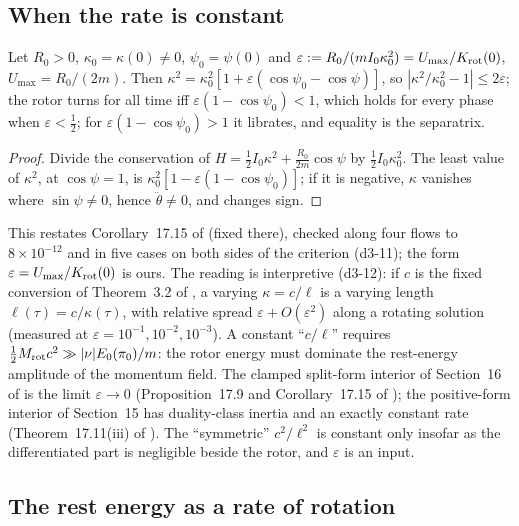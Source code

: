 \subsection{When the rate is constant}
\label{d3:sec:multiscale}

\begin{proposition}
\label{d3:prop:multiscale}
Let $R_0>0$, $\kappa_0=\kappa(0)\neq0$, $\psi_0=\psi(0)$ and $\varepsilon:=R_0/(mI_0\kappa_0^2)=U_{\max}/K_{\rm rot}(0)$, $U_{\max}=R_0/(2m)$. Then
$\kappa^2=\kappa_0^2[1+\varepsilon(\cos\psi_0-\cos\psi)]$, so $|\kappa^2/\kappa_0^2-1|\le2\varepsilon$; the rotor turns for all time iff
$\varepsilon(1-\cos\psi_0)<1$, which holds for every phase when $\varepsilon<\tfrac12$; for $\varepsilon(1-\cos\psi_0)>1$ it librates, and equality is
the separatrix.
\end{proposition}

\begin{proof}
Divide the conservation of $H=\tfrac12I_0\kappa^2+\tfrac{R_0}{2m}\cos\psi$ by $\tfrac12I_0\kappa_0^2$. The least value of $\kappa^2$, at $\cos\psi=1$, is
$\kappa_0^2[1-\varepsilon(1-\cos\psi_0)]$; if it is negative, $\kappa$ vanishes where $\sin\psi\neq0$, hence $\ddot\theta\neq0$, and changes sign.
\end{proof}

This restates Corollary~17.15 of \cite{ES17} (fixed there), checked along four flows to $8\times10^{-12}$ and in five cases on both sides of the
criterion (d3-11); the form $\varepsilon=U_{\max}/K_{\rm rot}(0)$ is ours. The reading is interpretive (d3-12): if $c$ is the fixed conversion of
Theorem~3.2 of \cite{ES17}, a varying $\kappa=c/\ell$ is a varying length $\ell(\tau)=c/\kappa(\tau)$, with relative spread
$\varepsilon+O(\varepsilon^2)$ along a rotating solution (measured at $\varepsilon=10^{-1},10^{-2},10^{-3}$). A constant
``$c/\ell$'' requires $\tfrac12M_{\rm rot}c^2\gg|\nu|E_0(\pi_0)/m$: the rotor energy must dominate the rest-energy amplitude of the momentum field. The
clamped split-form interior of Section~16 of \cite{ES17} is the limit $\varepsilon\to0$ (Proposition~17.9 and Corollary~17.15 of \cite{ES17}); the
positive-form interior of Section~15 has duality-class inertia and an exactly constant rate (Theorem~17.11(iii) of \cite{ES17}). The ``symmetric''
$c^2/\ell^2$ is constant only insofar as the differentiated part is negligible beside the rotor, and $\varepsilon$ is an input.

\subsection{The rest energy as a rate of rotation}
\label{d3:sec:rate}

